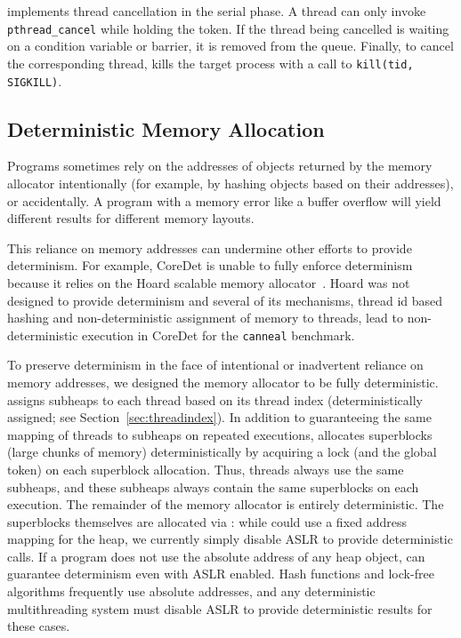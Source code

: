 \dthreads{} implements thread cancellation in the serial
phase. A thread can only invoke \texttt{pthread\_cancel} while holding the
token.  If the thread being cancelled is waiting on a condition
variable or barrier, it is removed from the queue. Finally, to cancel
the corresponding thread, \dthreads{} kills the target process
with a call to \texttt{kill(tid, SIGKILL)}.


\subsection{Deterministic Memory Allocation}

Programs sometimes rely on the addresses of objects returned by the memory
allocator intentionally (for example, by hashing objects based on
their addresses), or accidentally. A program with a memory error like
a buffer overflow will yield different results for different memory
layouts.

This reliance on memory addresses can undermine other efforts to
provide determinism. For example, CoreDet is unable to fully enforce
determinism because it relies on the Hoard scalable memory
allocator~\cite{BergerMcKinleyBlumofeWilson:ASPLOS2000}. Hoard was not
designed to provide determinism and several of its mechanisms, thread
id based hashing and non-deterministic assignment of memory to
threads, lead to non-deterministic execution in CoreDet for
the \texttt{canneal} benchmark.

To preserve determinism in the face of intentional or inadvertent
reliance on memory addresses, we designed the \dthreads{} memory allocator
to be fully deterministic. \dthreads{} assigns subheaps to each thread
based on its thread index (deterministically assigned; see
Section~\ref{sec:threadindex}). In addition to guaranteeing the same
mapping of threads to subheaps on repeated executions, \dthreads{}
allocates superblocks (large chunks of memory) deterministically by
acquiring a lock (and the global token) on each superblock
allocation. Thus, threads always use the same subheaps, and these
subheaps always contain the same superblocks on each execution. The
remainder of the memory allocator is entirely deterministic. The
superblocks themselves are allocated via \mmap{}: while \dthreads{}
could use a fixed address mapping for the heap, we currently simply disable
ASLR to provide deterministic \mmap{} calls.  If a program does not use the
absolute address of any heap object, \dthreads{} can guarantee determinism even
with ASLR enabled.  Hash functions and lock-free algorithms frequently use
absolute addresses, and any deterministic multithreading system must disable
ASLR to provide deterministic results for these cases.

